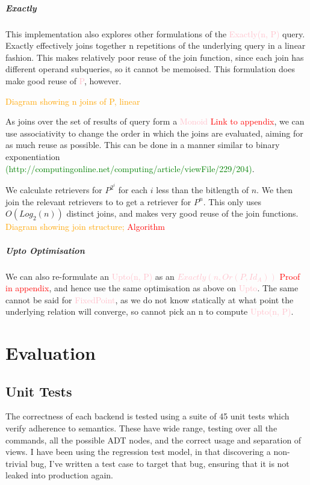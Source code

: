\documentclass[12pt,a4paper,twoside,openright]{report}
\newcommand\todo[1]{\textcolor{red}{#1}}
\newcommand\toReference[1]{\textcolor{green}{#1}}
\newcommand\diagramNeeded[1]{\textcolor{orange}{#1}}
\newcommand\mathName[1]{\textcolor{pink}{#1}}
\begin{document}
{{		\paragraph{Exactly}
		This implementation also explores other formulations of the \mathName{Exactly(n, P)} query. Exactly effectively joins together n repetitions of the underlying query in a linear fashion. This makes relatively poor reuse of the join function, since each join has different operand subqueries, so it cannot be memoised. This formulation does make good reuse of \mathName{P}, however.
		
		\diagramNeeded{Diagram showing n joins of P, linear}
		
		
		As joins over the set of results of query form a \mathName{Monoid} \todo{Link to appendix}, we can use associativity to change the order in which the joins are evaluated, aiming for as much reuse as possible. This can be done in a manner similar to binary exponentiation \toReference{(http://computingonline.net/computing/article/viewFile/229/204)}.

We calculate retrievers for $P^{2^i}$ for each $i$ less than the bitlength of $n$. We then join the relevant retrievers to to get a retriever for $P^n$. This only uses $O(Log_2(n))$ distinct joins, and makes very good reuse of the join functions. \diagramNeeded{Diagram showing join structure;} \todo{Algorithm}

		\paragraph{Upto Optimisation}
			We can also re-formulate an \mathName{Upto(n, P)} as an \mathName{$Exactly(n, Or(P, Id_A))$} \todo{Proof in appendix}, and hence use the same optimisation as above on \mathName{Upto}.  The same cannot be said for \mathName{FixedPoint}, as we do not know statically at what point the underlying relation will converge, so cannot pick an n to compute \mathName{Upto(n, P)}.



\chapter{Evaluation}
\section{Unit Tests}
The correctness of each backend is tested using a suite of 45 unit tests which verify adherence to semantics. These have  wide range, testing over all the commands, all the possible ADT nodes, and the correct usage and separation of views. I have been using the regression test model, in that discovering a non-trivial bug, I've written a test case to target that bug, ensuring that it is not leaked into production again.
}}
\end{document}
